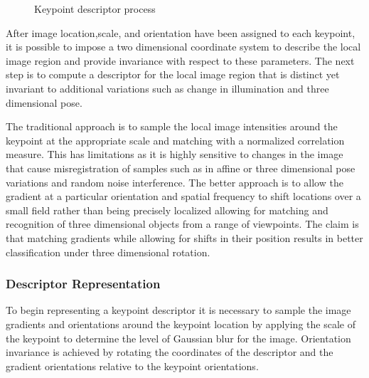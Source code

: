 \documentclass{article}
\begin{document}
\begin{figure}[ht]
  \begin{center}
  \end{center}
  \caption{Keypoint descriptor process}
  \label{Fi:KDP}
\end{figure}

After image location,scale, and orientation have been assigned to each keypoint, it is possible to impose a two dimensional coordinate system to describe the local image region and provide invariance with respect to these parameters.  
The next step is to compute a descriptor for the local image region that is distinct yet invariant to additional variations such as change in illumination and three dimensional pose.  

The traditional approach is to sample the local image intensities around the keypoint at the appropriate scale and matching with a normalized correlation measure.  
This has limitations as it is highly sensitive to changes in the image that cause misregistration of samples such as in affine or three dimensional pose variations and random noise interference.  
The better approach is to allow the gradient at a particular orientation and spatial frequency to shift locations over a small field rather than being precisely localized allowing for matching and recognition of three dimensional objects from a range of viewpoints.  
The claim is that matching gradients while allowing for shifts in their position results in better classification under three dimensional rotation.

\subsubsection{Descriptor Representation}\label{SSS:DR}
To begin representing a keypoint descriptor it is necessary to sample the image gradients and orientations around the keypoint location by applying the scale of the keypoint to determine the level of Gaussian blur for the image.  
Orientation invariance is achieved by rotating the coordinates of the descriptor and the gradient orientations relative to the keypoint orientations.  
\end{document}
